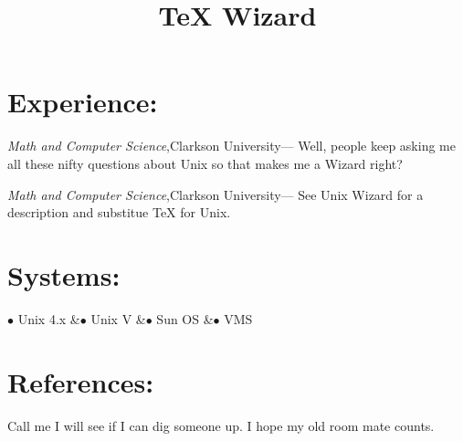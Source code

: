 \begin{resume}
\section{Experience:}
\begin{position}
{\it Math and Computer Science},Clarkson University---
Well, people keep asking me all these nifty questions about Unix
so that makes me a Wizard right?
\end{position}

\title{\TeX{} Wizard}

\begin{position}
{\it Math and Computer Science},Clarkson University---
See Unix Wizard for a description and substitue \TeX{} for Unix.
\end{position}

\section{Systems:}
\begin{ncolumn}{4}
$\bullet$  Unix 4.x 	&$\bullet$ Unix V	&$\bullet$ Sun OS
&$\bullet$ VMS\\
\end{ncolumn}

\section{References:}
Call me I will see if I can dig someone up.  I hope my old room mate
counts.

\end{resume}




